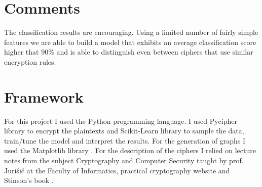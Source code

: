 \documentclass[a4paper]{article}
\begin{document}
\section{Comments}
The classification results are encouraging. Using a limited number of fairly simple features we are able to build a model that exhibits an average classification score higher that $90\%$ and is able to distinguish even between ciphers that use similar encryption rules.

\section{Framework}
For this project I used the Python programming language. I used Pycipher library \cite{pycipher} to encrypt the plaintexts and Scikit-Learn library \cite{scikit-learn} to sample the data, train/tune the model and interpret the results. For the generation of graphs I used the Matplotlib library \cite{Hunter:2007}. For the description of the ciphers I relied on lecture notes from the subject Cryptography and Computer Security taught by prof. Jurišič at the Faculty of Informatics, practical cryptography website \cite{practicalCrypto} and Stinson's book \cite{stinson2005cryptography}.



\end{document}
